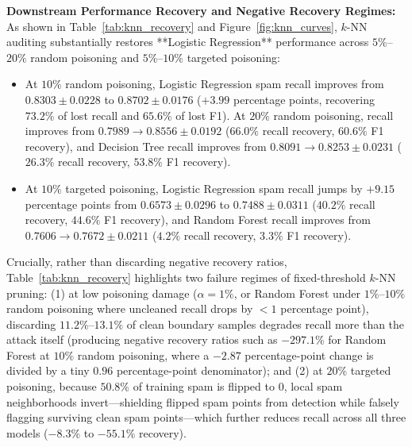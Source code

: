 \documentclass[10pt,conference]{IEEEtran}
\begin{document}
\textbf{Downstream Performance Recovery and Negative Recovery Regimes:} As shown in Table~\ref{tab:knn_recovery} and Figure~\ref{fig:knn_curves}, $k$-NN auditing substantially restores **Logistic Regression** performance across $5\%$--$20\%$ random poisoning and $5\%$--$10\%$ targeted poisoning:
\begin{itemize}
    \item At $10\%$ random poisoning, Logistic Regression spam recall improves from $0.8303 \pm 0.0228$ to $0.8702 \pm 0.0176$ ($+3.99$ percentage points, recovering $73.2\%$ of lost recall and $65.6\%$ of lost F1). At $20\%$ random poisoning, recall improves from $0.7989 \to 0.8556 \pm 0.0192$ ($66.0\%$ recall recovery, $60.6\%$ F1 recovery), and Decision Tree recall improves from $0.8091 \to 0.8253 \pm 0.0231$ ($26.3\%$ recall recovery, $53.8\%$ F1 recovery).
    \item At $10\%$ targeted poisoning, Logistic Regression spam recall jumps by $+9.15$ percentage points from $0.6573 \pm 0.0296$ to $0.7488 \pm 0.0311$ ($40.2\%$ recall recovery, $44.6\%$ F1 recovery), and Random Forest recall improves from $0.7606 \to 0.7672 \pm 0.0211$ ($4.2\%$ recall recovery, $3.3\%$ F1 recovery).
\end{itemize}
Crucially, rather than discarding negative recovery ratios, Table~\ref{tab:knn_recovery} highlights two failure regimes of fixed-threshold $k$-NN pruning: (1) at low poisoning damage ($\alpha=1\%$, or Random Forest under $1\%$--$10\%$ random poisoning where uncleaned recall drops by $<1$ percentage point), discarding $11.2\%$--$13.1\%$ of clean boundary samples degrades recall more than the attack itself (producing negative recovery ratios such as $-297.1\%$ for Random Forest at $10\%$ random poisoning, where a $-2.87$ percentage-point change is divided by a tiny $0.96$ percentage-point denominator); and (2) at $20\%$ targeted poisoning, because $50.8\%$ of training spam is flipped to $0$, local spam neighborhoods invert---shielding flipped spam points from detection while falsely flagging surviving clean spam points---which further reduces recall across all three models ($-8.3\%$ to $-55.1\%$ recovery).
\end{document}
